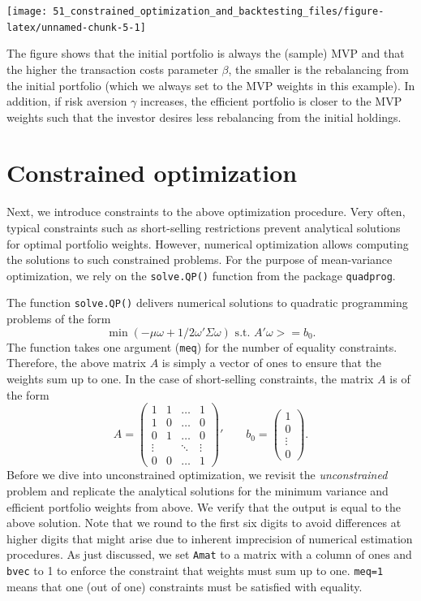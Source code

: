 \documentclass[
]{book}
\begin{document}
\begin{center}\texttt{[image: 51\_constrained\_optimization\_and\_backtesting\_files/figure-latex/unnamed-chunk-5-1]} \end{center}

The figure shows that the initial portfolio is always the (sample) MVP and that the higher the transaction costs parameter \(\beta\), the smaller is the rebalancing from the initial portfolio (which we always set to the MVP weights in this example). In addition, if risk aversion \(\gamma\) increases, the efficient portfolio is closer to the MVP weights such that the investor desires less rebalancing from the initial holdings.

\hypertarget{constrained-optimization}{%
\section{Constrained optimization}\label{constrained-optimization}}

Next, we introduce constraints to the above optimization procedure. Very often, typical constraints such as short-selling restrictions prevent analytical solutions for optimal portfolio weights. However, numerical optimization allows computing the solutions to such constrained problems. For the purpose of mean-variance optimization, we rely on the \texttt{solve.QP()} function from the package \texttt{quadprog}.

The function \texttt{solve.QP()} delivers numerical solutions to quadratic programming problems of the form
\[\min(-\mu \omega + 1/2 \omega' \Sigma \omega) \text{ s.t. } A' \omega >= b_0.\]
The function takes one argument (\texttt{meq}) for the number of equality constraints. Therefore, the above matrix \(A\) is simply a vector of ones to ensure that the weights sum up to one. In the case of short-selling constraints, the matrix \(A\) is of the form
\[A = \begin{pmatrix}1 & 1& \ldots&1 \\1 & 0 &\ldots&0\\0 & 1 &\ldots&0\\\vdots&&\ddots&\vdots\\0&0&\ldots&1\end{pmatrix}'\qquad b_0 = \begin{pmatrix}1\\0\\\vdots\\0\end{pmatrix}.\]
Before we dive into unconstrained optimization, we revisit the \emph{unconstrained} problem and replicate the analytical solutions for the minimum variance and efficient portfolio weights from above. We verify that the output is equal to the above solution. Note that we round to the first six digits to avoid differences at higher digits that might arise due to inherent imprecision of numerical estimation procedures. As just discussed, we set \texttt{Amat} to a matrix with a column of ones and \texttt{bvec} to 1 to enforce the constraint that weights must sum up to one. \texttt{meq=1} means that one (out of one) constraints must be satisfied with equality.
\end{document}
